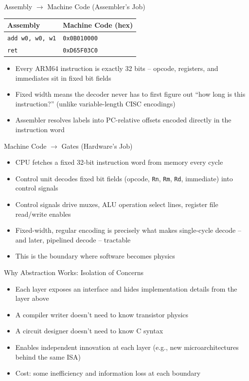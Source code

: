 \documentclass[10pt, aspectratio=169]{beamer}
\begin{document}
\begin{frame}{Assembly $\rightarrow$ Machine Code (Assembler's Job)}
\begin{center}
\begin{tabular}{l l}
\textbf{Assembly} & \textbf{Machine Code (hex)} \\
\hline
\texttt{add w0, w0, w1} & \texttt{0x0B010000} \\
\texttt{ret} & \texttt{0xD65F03C0} \\
\end{tabular}
\end{center}
\begin{itemize}
    \item Every ARM64 instruction is exactly 32 bits -- opcode, registers, and immediates sit in fixed bit fields
    \item Fixed width means the decoder never has to first figure out ``how long is this instruction?'' (unlike variable-length CISC encodings)
    \item Assembler resolves labels into PC-relative offsets encoded directly in the instruction word
\end{itemize}
\end{frame}

\begin{frame}{Machine Code $\rightarrow$ Gates (Hardware's Job)}
\begin{itemize}
    \item CPU fetches a fixed 32-bit instruction word from memory every cycle
    \item Control unit decodes fixed bit fields (opcode, \texttt{Rn}, \texttt{Rm}, \texttt{Rd}, immediate) into control signals
    \item Control signals drive muxes, ALU operation select lines, register file read/write enables
    \item Fixed-width, regular encoding is precisely what makes single-cycle decode -- and later, pipelined decode -- tractable
    \item This is the boundary where software becomes physics
\end{itemize}
\end{frame}

\begin{frame}{Why Abstraction Works: Isolation of Concerns}
\begin{itemize}
    \item Each layer exposes an interface and hides implementation details from the layer above
    \item A compiler writer doesn't need to know transistor physics
    \item A circuit designer doesn't need to know C syntax
    \item Enables independent innovation at each layer (e.g., new microarchitectures behind the same ISA)
    \item Cost: some inefficiency and information loss at each boundary
\end{itemize}
\end{frame}
\end{document}
